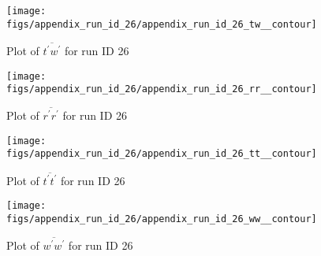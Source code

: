 \begin{figure}[H]
\centering
\texttt{[image: figs/appendix\_run\_id\_26/appendix\_run\_id\_26\_tw\_\_contour]}
\caption{Plot of $\overline{t^\prime w^\prime}$ for run ID 26}
\label{fig:appendix_run_id_26_tw__contour}
\end{figure}


\begin{figure}[H]
\centering
\texttt{[image: figs/appendix\_run\_id\_26/appendix\_run\_id\_26\_rr\_\_contour]}
\caption{Plot of $\overline{r^\prime r^\prime}$ for run ID 26}
\label{fig:appendix_run_id_26_rr__contour}
\end{figure}


\begin{figure}[H]
\centering
\texttt{[image: figs/appendix\_run\_id\_26/appendix\_run\_id\_26\_tt\_\_contour]}
\caption{Plot of $\overline{t^\prime t^\prime}$ for run ID 26}
\label{fig:appendix_run_id_26_tt__contour}
\end{figure}


\begin{figure}[H]
\centering
\texttt{[image: figs/appendix\_run\_id\_26/appendix\_run\_id\_26\_ww\_\_contour]}
\caption{Plot of $\overline{w^\prime w^\prime}$ for run ID 26}
\label{fig:appendix_run_id_26_ww__contour}
\end{figure}


